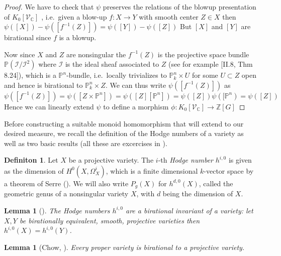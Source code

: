 \documentclass[11pt, a4paper, german]{article}
\theoremstyle{plain}
\newtheorem{lemma}[theorem]{Lemma}
\theoremstyle{definition}
\newtheorem{definition}[theorem]{Definiton}
\newcommand{\gring}[1][k]{K_0[\mathcal{V}_#1]}
\begin{document}
\begin{proof}
    We have to check that $\psi$ preserves the relations of the blowup presentation of $\gring[\mathbb{C}]$
    , i.e.\ given a blow-up $f \colon X \to Y$ with smooth center $Z \in X$ then $\psi([X]) - \psi([f^{-1}(Z)]) = \psi([Y]) - \psi([Z])$  
    But $[X]$ and $[Y]$ are birational since $f$ is a blowup.
    
    Now since $X$ and $Z$ are nonsingular the $f^{-1}(Z)$ is the projective space bundle  $\mathbb{P}(\mathcal{I}/\mathcal{I}^2)$ 
    where $\mathcal{I}$ is the ideal sheaf associated to $Z$ (see for example \cite{Ha}[II.8, Thm 8.24]),
    which is a $\mathbb{P}^n$-bundle, i.e.\ locally trivializes to $\mathbb{P}_k^n \times U$ for some $U \subset Z$ open 
    and hence is birational to $\mathbb{P}_k^n \times Z$. 
    We can thus write $\psi([f^{-1}(Z)])$ as  
    \[
        \psi([f^{-1}(Z)]) = \psi([Z \times \mathbb{P}^n]) = \psi([Z][\mathbb{P}^n]) = \psi([Z])\psi([\mathbb{P}^n) = \psi([Z])
    \]
    Hence we can linearly extend $\psi$ to define a morphism $\phi \colon \gring[\mathbb{C}] \to \mathbb{Z} [G]$
\end{proof}

Before constructing a suitable monoid homomorphism that will extend to our desired measure, we recall the definition of the Hodge numbers
of a variety as well as two basic results (all these are excercises in \cite[Ch. II]{Ha}).

\begin{definition}
    Let $X$ be a projective variety. The $i$-th \emph{Hodge number} $h^{i,0}$ is given as the dimension of $H^0(X,\Omega^i_X)$, 
    which is a finite dimensional $k$-vector space by a theorem of Serre (\cite[§3 Prop. 7]{FAC}).
    We will also write $P_g(X)$ for $h^{d,0}(X)$, called the geometric genus of a nonsingular variety $X$, with $d$ being the dimension of $X$.
\end{definition}

\begin{lemma}[{\cite[II Ex. 8.8]{Ha}}]
    \label{bir}
    The Hodge numbers $h^{i,0}$ are a birational invariant of a variety: let $X, Y$ be birationally equivalent, smooth, projective varieties
    then $h^{i,0}(X) = h^{i,0}(Y)$.
\end{lemma}

\begin{lemma}[Chow, {\cite[II Ex. 4.10]{Ha}}]
    Every proper variety is birational to a projective variety.
\end{lemma}
\end{document}
